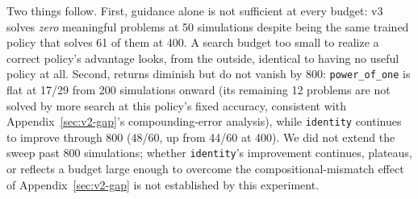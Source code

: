 \documentclass[11pt]{article}
\numberwithin{equation}{section}
\begin{document}
Two things follow. First, guidance alone is not sufficient at every budget: v3 solves \emph{zero} meaningful problems at 50 simulations despite being the same trained policy that solves 61 of them at 400. A search budget too small to realize a correct policy's advantage looks, from the outside, identical to having no useful policy at all. Second, returns diminish but do not vanish by 800: \texttt{power\_of\_one} is flat at 17/29 from 200 simulations onward (its remaining 12 problems are not solved by more search at this policy's fixed accuracy, consistent with Appendix~\ref{sec:v2-gap}'s compounding-error analysis), while \texttt{identity} continues to improve through 800 (48/60, up from 44/60 at 400). We did not extend the sweep past 800 simulations; whether \texttt{identity}'s improvement continues, plateaus, or reflects a budget large enough to overcome the compositional-mismatch effect of Appendix~\ref{sec:v2-gap} is not established by this experiment.
\end{document}
